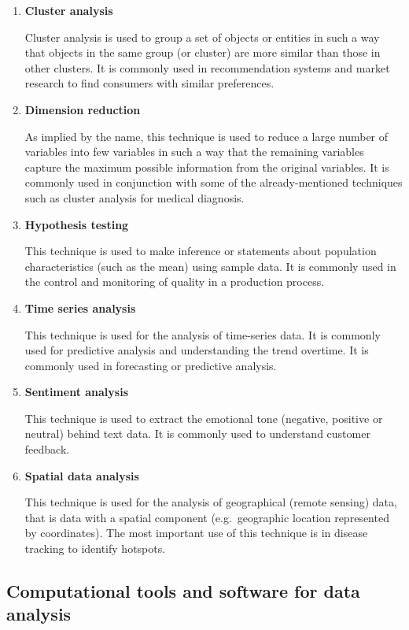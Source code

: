 \documentclass[
]{book}
\begin{document}
\begin{enumerate}
\def\labelenumi{\arabic{enumi}.}
\setcounter{enumi}{2}
\item
  \textbf{Cluster analysis}

  Cluster analysis is used to group a set of objects or entities in such a way that objects in the same group (or cluster) are more similar than those in other clusters. It is commonly used in recommendation systems and market research to find consumers with similar preferences.
\item
  \textbf{Dimension reduction}

  As implied by the name, this technique is used to reduce a large number of variables into few variables in such a way that the remaining variables capture the maximum possible information from the original variables. It is commonly used in conjunction with some of the already-mentioned techniques such as cluster analysis for medical diagnosis.
\item
  \textbf{Hypothesis testing}

  This technique is used to make inference or statements about population characteristics (such as the mean) using sample data. It is commonly used in the control and monitoring of quality in a production process.
\item
  \textbf{Time series analysis}

  This technique is used for the analysis of time-series data. It is commonly used for predictive analysis and understanding the trend overtime. It is commonly used in forecasting or predictive analysis.
\item
  \textbf{Sentiment analysis}

  This technique is used to extract the emotional tone (negative, positive or neutral) behind text data. It is commonly used to understand customer feedback.
\item
  \textbf{Spatial data analysis}

  This technique is used for the analysis of geographical (remote sensing) data, that is data with a spatial component (e.g.~geographic location represented by coordinates). The most important use of this technique is in disease tracking to identify hotspots.
\end{enumerate}

\subsection{Computational tools and software for data analysis}\label{computational-tools-and-software-for-data-analysis}
\end{document}
